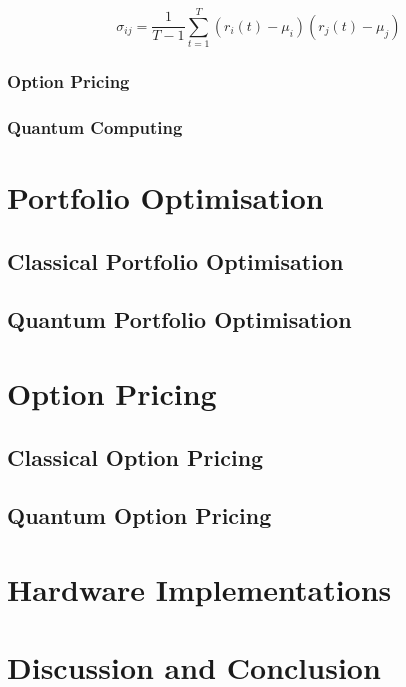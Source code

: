 \documentclass[prx,twocolumn,floatfix,superscriptaddress,longbibliography]{revtex4-1}
\begin{document}
\begin{equation}
  \label{eq:5}
  \sigma_{ij} = \frac{1}{T-1} \sum_{t=1}^{T} (r_i(t) - \mu_i)(r_j(t) - \mu_j)
\end{equation}

\subsubsection{Option Pricing}



\subsubsection{Quantum Computing}


\section{Portfolio Optimisation}\label{sec:literature1}



\subsection{Classical Portfolio Optimisation}

\subsection{Quantum Portfolio Optimisation}


\section{Option Pricing}\label{sec:literature2}

\subsection{Classical Option Pricing}

\subsection{Quantum Option Pricing}


\section{Hardware Implementations}\label{sec:hardware}




\section{Discussion and Conclusion}\label{sec:discussion}



\FloatBarrier


\end{document}

